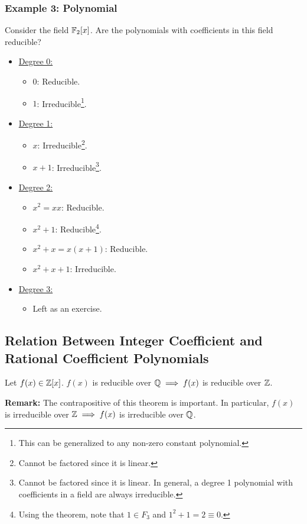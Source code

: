 \documentclass[letterpaper]{article}
\begin{document}
\subsubsection{Example 3: Polynomial}
Consider the field $\mathbb{F}_{2}[x]$. Are the polynomials with coefficients in this field reducible?
\begin{itemize}
    \item \underline{Degree 0:} 
    \begin{itemize}
        \item $0$: Reducible.
        \item $1$: Irreducible\footnote{This can be generalized to any non-zero constant polynomial.}.
    \end{itemize}

    \item \underline{Degree 1:}
    \begin{itemize}
        \item $x$: Irreducible\footnote{Cannot be factored since it is linear.}. 
        \item $x + 1$: Irreducible\footnote{Cannot be factored since it is linear. In general, a degree 1 polynomial with coefficients in a field are always irreducible.}.
    \end{itemize}

    \item \underline{Degree 2:}
    \begin{itemize}
        \item $x^2 = xx$: Reducible. 
        \item $x^2 + 1$: Reducible\footnote{Using the theorem, note that $1 \in F_3$ and $1^2 + 1 = 2 \equiv 0$.}.
        \item $x^2 + x = x(x + 1)$: Reducible.
        \item $x^2 + x + 1$: Irreducible.
    \end{itemize}

    \item \underline{Degree 3:}
    \begin{itemize}
        \item Left as an exercise. 
    \end{itemize}
\end{itemize}

\subsection{Relation Between Integer Coefficient and Rational Coefficient Polynomials}
\begin{theorem}{}{}
    Let $f(x) \in \mathbb{Z}[x]$. $f(x)$ is reducible over $\mathbb{Q} \implies f(x)$ is reducible over $\mathbb{Z}$.
\end{theorem}
\textbf{Remark:} The contrapositive of this theorem is important. In particular, $f(x)$ is irreducible over $\mathbb{Z} \implies f(x)$ is irreducible over $\mathbb{Q}$. 
\end{document}
